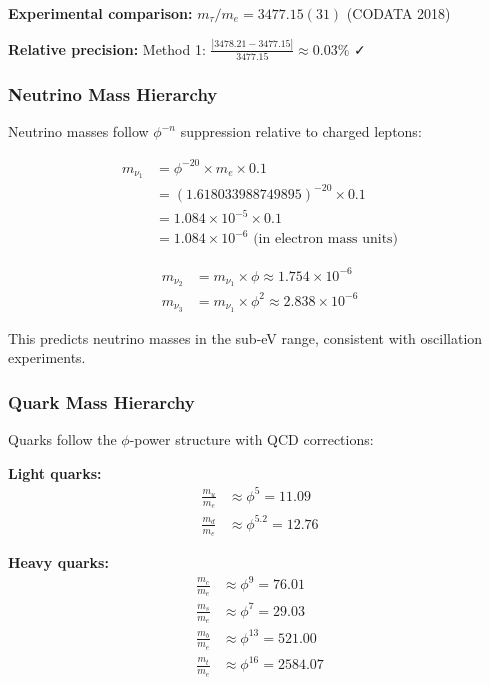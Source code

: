 \textbf{Experimental comparison:} $m_\tau/m_e = 3477.15(31)$ (CODATA 2018)

\textbf{Relative precision:} Method 1: $\frac{|3478.21 - 3477.15|}{3477.15} \approx 0.03\%$ ✓

\subsubsection{Neutrino Mass Hierarchy}

Neutrino masses follow $\phi^{-n}$ suppression relative to charged leptons:

\begin{align}
m_{\nu_1} &= \phi^{-20} \times m_e \times 0.1 \tag{Lightest neutrino}\\
&= (1.618033988749895)^{-20} \times 0.1 \\
&= 1.084 \times 10^{-5} \times 0.1 \\
&= 1.084 \times 10^{-6} \text{ (in electron mass units)}
\end{align}

\begin{align}
m_{\nu_2} &= m_{\nu_1} \times \phi \approx 1.754 \times 10^{-6} \\
m_{\nu_3} &= m_{\nu_1} \times \phi^2 \approx 2.838 \times 10^{-6}
\end{align}

This predicts neutrino masses in the sub-eV range, consistent with oscillation experiments.

\subsubsection{Quark Mass Hierarchy}

Quarks follow the $\phi$-power structure with QCD corrections:

\textbf{Light quarks:}
\begin{align}
\frac{m_u}{m_e} &\approx \phi^5 = 11.09 \tag{Up quark constituent}\\
\frac{m_d}{m_e} &\approx \phi^{5.2} = 12.76 \tag{Down quark}
\end{align}

\textbf{Heavy quarks:}
\begin{align}
\frac{m_c}{m_e} &\approx \phi^9 = 76.01 \tag{Charm quark}\\
\frac{m_s}{m_e} &\approx \phi^7 = 29.03 \tag{Strange quark}\\
\frac{m_b}{m_e} &\approx \phi^{13} = 521.00 \tag{Bottom quark}\\
\frac{m_t}{m_e} &\approx \phi^{16} = 2584.07 \tag{Top quark}
\end{align}

